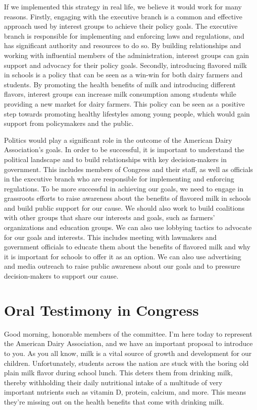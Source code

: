 \documentclass[a4paper, 12pt]{article}
\begin{document}
\hspace{\parindent} If we implemented this strategy in real life, we believe it would work for many reasons. Firstly, engaging with the executive branch is a common and effective approach used by interest groups to achieve their policy goals. The executive branch is responsible for implementing and enforcing laws and regulations, and has significant authority and resources to do so. By building relationships and working with influential members of the administration, interest groups can gain support and advocacy for their policy goals. Secondly, introducing flavored milk in schools is a policy that can be seen as a win-win for both dairy farmers and students. By promoting the health benefits of milk and introducing different flavors, interest groups can increase milk consumption among students while providing a new market for dairy farmers. This policy can be seen as a positive step towards promoting healthy lifestyles among young people, which would gain support from policymakers and the public.

\hspace{\parindent} Politics would play a significant role in the outcome of the American Dairy Association's goals. In order to be successful, it is important to understand the political landscape and to build relationships with key decision-makers in government. This includes members of Congress and their staff, as well as officials in the executive branch who are responsible for implementing and enforcing regulations. To be more successful in achieving our goals, we need to engage in grassroots efforts to raise awareness about the benefits of flavored milk in schools and build public support for our cause. We should also work to build coalitions with other groups that share our interests and goals, such as farmers' organizations and education groups. We can also use lobbying tactics to advocate for our goals and interests. This includes meeting with lawmakers and government officials to educate them about the benefits of flavored milk and why it is important for schools to offer it as an option. We can also use advertising and media outreach to raise public awareness about our goals and to pressure decision-makers to support our cause.
\pagebreak
\section{Oral Testimony in Congress}
\hspace{\parindent} Good morning, honorable members of the committee. I'm here today to represent the American Dairy Association, and we have an important proposal to introduce to you. As you all know, milk is a vital source of growth and development for our children. Unfortunately, students across the nation are stuck with the boring old plain milk flavor during school lunch. This deters them from drinking milk, thereby withholding their daily nutritional intake of a multitude of very important nutrients such as vitamin D, protein, calcium, and more. This means they're missing out on the health benefits that come with drinking milk. 
\end{document}
